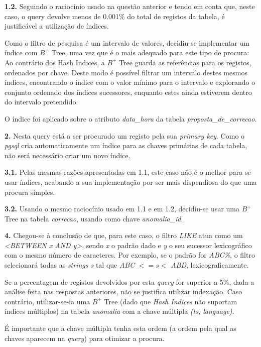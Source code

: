 \documentclass[12pt]{report}
\begin{document}
    \par \textbf{1.2.} Seguindo o raciocínio usado na questão anterior e tendo em conta que, neste caso, o query devolve menos de 0.001\% do total de registos da tabela, é justificável a utilização de índices.

    \par Como o filtro de pesquisa é um intervalo de valores, decidiu-se implementar um índice com $B^+$ Tree, uma vez que é o mais adequado para este tipo de procura: Ao contrário dos Hash Indices, a $B^+$ Tree guarda as referências para os registos, ordenados por chave. Deste modo é possível filtrar um intervalo destes mesmos índices, encontrando o índice com o valor mínimo para o intervalo e explorando o conjunto ordenado dos índices sucessores, enquanto estes ainda estiverem dentro do intervalo pretendido.
    \par O índice foi aplicado sobre o atributo \textit{{data\_hora}} da tabela \textit{proposta\_de\_correcao}.\\

    \par \textbf{2.} Nesta query está a ser procurado um registo pela sua \textit{primary key}. Como o \textit{pgsql} cria automaticamente um índice para as chaves primárias de cada tabela, não será necessário criar um novo índice.\\

    \par \textbf{3.1.} Pelas mesmas razões apresentadas em 1.1, este caso não é o melhor para se usar índices, acabando a sua implementação por ser mais dispendiosa do que uma procura simples.\\

    \par \textbf{3.2.} Usando o mesmo raciocínio usado em 1.1 e em 1.2, decidiu-se usar uma $B^+$ Tree na tabela \textit{correcao}, usando como chave \textit{anomalia\_id}.\\


    \par \textbf{4.} Chegou-se à conclusão de que, para este caso, o filtro \textit{LIKE} atua como um \textit{<BETWEEN x AND y>}, sendo \textit{x} o padrão dado e \textit{y} o seu sucessor lexicográfico com o mesmo número de caracteres. Por exemplo, se o padrão for \textit{ABC\%}, o filtro selecionará todas as \textit{strings s} tal que \textit{ABC} $<= s <$ \textit{ABD}, lexicograficamente.

    \par Se a percentagem de registos devolvidos por esta \textit{query} for superior a 5\%, dada a análise feita nas respostas anteriores, não se justifica utilizar indexação. Caso contrário, utilizar-se-ia uma $B^+$ Tree (dado que \textit{Hash Indices} não suportam índices múltiplos) na tabela \textit{anomalia} com a chave múltipla \textit{(ts, language)}.
    \par É importante que a chave múltipla tenha esta ordem (a ordem pela qual as chaves aparecem na \textit{query}) para otimizar a procura.\\
\end{document}
